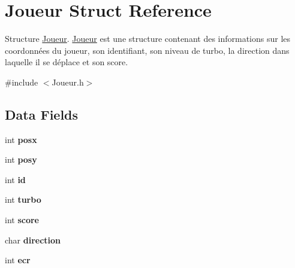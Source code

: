 \hypertarget{struct_joueur}{\section{Joueur Struct Reference}
\label{struct_joueur}
}


Structure \hyperlink{struct_joueur}{Joueur}. \hyperlink{struct_joueur}{Joueur} est une structure contenant des informations sur les coordonnées du joueur, son identifiant, son niveau de turbo, la direction dans laquelle il se déplace et son score.  




{\ttfamily \#include $<$Joueur.\-h$>$}

\subsection*{Data Fields}
\begin{DoxyCompactItemize}
\item 
\hypertarget{struct_joueur_a785822f45512100cdbcc3cfc3da1071f}{int {\bfseries posx}}\label{struct_joueur_a785822f45512100cdbcc3cfc3da1071f}

\item 
\hypertarget{struct_joueur_a613547e48cc748be8044231439c51b29}{int {\bfseries posy}}\label{struct_joueur_a613547e48cc748be8044231439c51b29}

\item 
\hypertarget{struct_joueur_a7441ef0865bcb3db9b8064dd7375c1ea}{int {\bfseries id}}\label{struct_joueur_a7441ef0865bcb3db9b8064dd7375c1ea}

\item 
\hypertarget{struct_joueur_aee78eaf1a5ef0225bf8f0d146becc1ca}{int {\bfseries turbo}}\label{struct_joueur_aee78eaf1a5ef0225bf8f0d146becc1ca}

\item 
\hypertarget{struct_joueur_aef160b7437d94056f1dc59646cd5b87d}{int {\bfseries score}}\label{struct_joueur_aef160b7437d94056f1dc59646cd5b87d}

\item 
\hypertarget{struct_joueur_a210b3e6ffb6e047c4ae6e2c0e737ed52}{char {\bfseries direction}}\label{struct_joueur_a210b3e6ffb6e047c4ae6e2c0e737ed52}

\item 
\hypertarget{struct_joueur_abee94c29f7b63d5615674cad48e0eb70}{int {\bfseries ecr}}\label{struct_joueur_abee94c29f7b63d5615674cad48e0eb70}

\end{DoxyCompactItemize}


